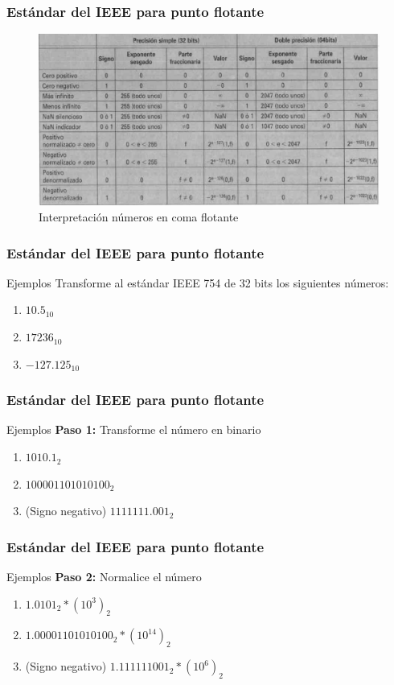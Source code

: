 \documentclass{beamer}
\begin{document}
\begin{frame}
	\frametitle{Estándar del IEEE para punto flotante}
	\begin{figure}[H]
		\centering
		\includegraphics[scale=0.25]{imagenes/valoresespecialesIEEE754.png}
		\caption{Interpretación números en coma flotante}
	\end{figure}
\end{frame}

\begin{frame}
	\frametitle{Estándar del IEEE para punto flotante}
	\begin{block}{Ejemplos}
	Transforme al estándar IEEE 754 de 32 bits los siguientes números:
	\begin{enumerate}
		\item $10.5_{10}$
		\item $17236_{10}$
		\item $-127.125_{10}$
	\end{enumerate}	
	\end{block}
\end{frame}

\begin{frame}
	\frametitle{Estándar del IEEE para punto flotante}
	\begin{block}{Ejemplos}
	\textbf{Paso 1:} Transforme el número en binario
	\begin{enumerate}
		\item $1010.1_{2}$
		\item $100001101010100_{2}$
		\item (Signo negativo) $1111111.001_{2}$
	\end{enumerate}	
	\end{block}
\end{frame}


\begin{frame}
	\frametitle{Estándar del IEEE para punto flotante}
	\begin{block}{Ejemplos}
	\textbf{Paso 2:} Normalice el número
	\begin{enumerate}
		\item $1.0101_{2}*(10^{3})_{2}$
		\item $1.00001101010100_{2}*(10^{14})_{2}$
		\item (Signo negativo) $1.111111001_{2}*(10^{6})_{2}$
	\end{enumerate}	
	\end{block}
\end{frame}
\end{document}
